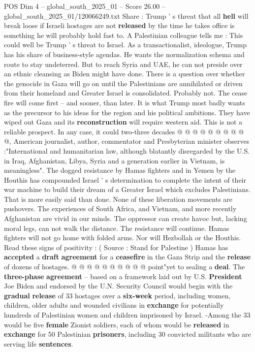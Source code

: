 \begin{textsample}{POS Dim 4 – global\_south\_2025\_01 – Score 26.00 – global\_south\_2025\_01/120066249.txt}  \label{ex:f4_pos_020}
Share : Trump ' s threat that all \textbf{hell} will break loose if Israeli hostages are not \textbf{released} by the time he takes office is something he will probably hold fast to.
A Palestinian colleague tells me : This could well be Trump ' s threat to Israel.
As a transactionalist, ideologue, Trump has his share of business-style agendas.
He wants the normalization schema and route to stay undeterred.
But to reach Syria and UAE, he can not preside over an ethnic cleansing as Biden might have done.
There is a question over whether the genocide in Gaza will go on until the Palestinians are annihilated or driven from their homeland and Greater Israel is consolidated.
Probably not.
The cease fire will come first -- and sooner, than later.
It is what Trump most badly wants as the precursor to his ideas for the region and his political ambitions.
They have wiped out Gaza and its \textbf{reconstruction} will require western aid.
This is not a reliable prospect.
In any case, it could two-three decades @ @ @ @ @ @ @ @ @ @, American journalist, author, commentator and Presbyterian minister observes :"International and humanitarian law, although blatantly disregarded by the U.S. in Iraq, Afghanistan, Libya, Syria and a generation earlier in Vietnam, is meaningless".
The dogged resistance by Hamas fighters and in Yemen by the Houthis has compounded Israel ' s determination to complete the intent of their war machine to build their dream of a Greater Israel which excludes Palestinians.
That is more easily said than done.
None of these liberation movements are pushovers.
The experiences of South Africa, and Vietnam, and more recently Afghanistan are vivid in our minds.
The oppressor can create havoc but, lacking moral legs, can not walk the distance.
The resistance will continue.
Hamas fighters will not go home with folded arms.
Nor will Hezbollah or the Houthis.
Read these signs of positivity : ( Source : Stand for Palestine ) Hamas has \textbf{accepted} a \textbf{draft} \textbf{agreement} for a \textbf{ceasefire} in the Gaza Strip and the \textbf{release} of dozens of hostages. @ @ @ @ @ @ @ @ @ @ point"yet to sealing a \textbf{deal}.
The \textbf{three-phase} \textbf{agreement} -- based on a framework laid out by U.S. \textbf{President} Joe Biden and endorsed by the U.N.
Security Council would begin with the \textbf{gradual} \textbf{release} of 33 hostages over a \textbf{six-week} period, including women, children, older adults and wounded civilians in \textbf{exchange} for potentially hundreds of Palestinian women and children imprisoned by Israel. -Among the 33 would be five \textbf{female} Zionist soldiers, each of whom would be \textbf{released} in \textbf{exchange} for 50 Palestinian \textbf{prisoners}, including 30 convicted militants who are serving life \textbf{sentences}.

\end{textsample}
